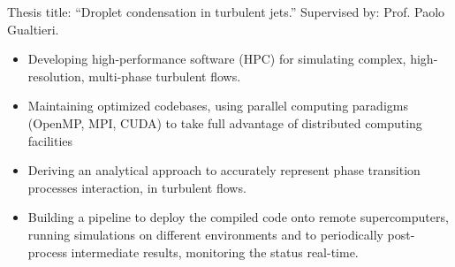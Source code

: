 









\iflongversion

	Thesis title: ``Droplet condensation in turbulent jets.'' Supervised by: Prof. Paolo Gualtieri. \\
	\smallskip
	\begin{itemize}
		\item Developing high-performance software (HPC) for simulating complex, high-resolution, multi-phase turbulent flows.
		\item Maintaining optimized codebases, using parallel computing paradigms (OpenMP, MPI, CUDA) to take full advantage of distributed computing facilities
		\item Deriving an analytical approach to accurately represent phase transition processes interaction, in turbulent flows.
		\item Building a pipeline to deploy the compiled code onto remote supercomputers, running simulations on different environments and to periodically post-process intermediate results, monitoring the status real-time.
	\end{itemize}
	\medskip
	\
	\medskip

